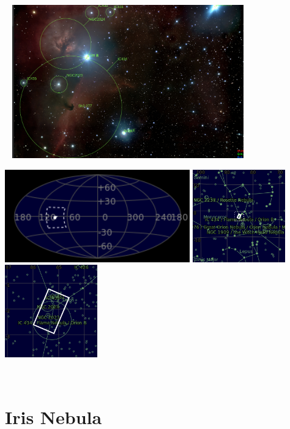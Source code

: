 \begin{center}
 \ \newpage
\includegraphics[width=0.75\textwidth]{../Imaging//Annotated/Horse_Head_Nebula_Annotated.jpg}

\includegraphics[height=4cm]{../Imaging//Annotated/Horse_Head_Nebula_Globe.jpg}
\includegraphics[height=4cm]{../Imaging//Annotated/Horse_Head_Nebula_Close.jpg}
\includegraphics[height=4cm]{../Imaging//Annotated/Horse_Head_Nebula_Closer.jpg}
\end{center}
\ \\\section{Iris Nebula}
